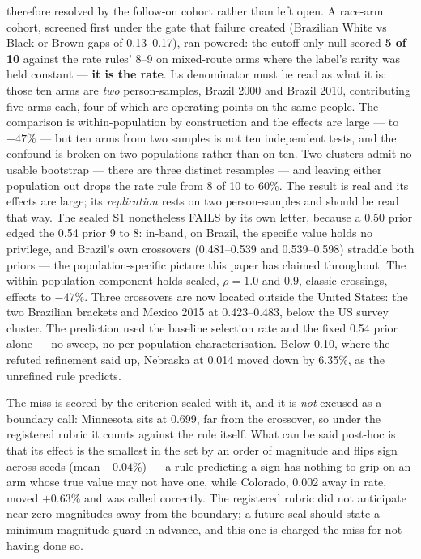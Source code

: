 \documentclass[conference]{IEEEtran}
\begin{document}
therefore resolved by the follow-on cohort rather than left open. A race-arm cohort,
screened first under the gate that failure created (Brazilian White vs Black-or-Brown
gaps of 0.13--0.17), ran powered: the cutoff-only null scored \textbf{5 of 10}
against the rate rules' 8--9 on mixed-route arms where the label's rarity was held
constant --- \textbf{it is the rate}. Its denominator must be read as what it is: those
ten arms are \emph{two} person-samples, Brazil 2000 and Brazil 2010, contributing five
arms each, four of which are operating points on the same people. The comparison is
within-population by construction and the effects are large --- to $-47\%$ --- but ten
arms from two samples is not ten independent tests, and the confound is broken on two
populations rather than on ten. Two clusters admit no usable bootstrap --- there are three
distinct resamples --- and leaving either population out drops the rate rule from 8 of 10
to 60\%. The result is real and its effects are large; its \emph{replication} rests on two
person-samples and should be read that way. The sealed S1 nonetheless FAILS by its own
letter, because a 0.50 prior edged the 0.54 prior 9 to 8: in-band, on Brazil, the
specific value holds no privilege, and Brazil's own crossovers (0.481--0.539 and
0.539--0.598) straddle both priors --- the population-specific picture this paper has
claimed throughout. The within-population component holds sealed, $\rho = 1.0$ and
$0.9$, classic crossings, effects to $-47\%$. Three crossovers are now located
outside the United States: the two Brazilian brackets and Mexico 2015 at
0.423--0.483, below the US survey cluster. The prediction used
the baseline selection rate and the fixed 0.54 prior alone --- no sweep, no per-population
characterisation. Below 0.10, where the refuted refinement said up, Nebraska at 0.014 moved
down by 6.35\%, as the unrefined rule predicts.

The miss is scored by the criterion sealed with it, and it is \emph{not} excused as a boundary
call: Minnesota sits at 0.699, far from the crossover, so under the registered rubric it
counts against the rule itself. What can be said post-hoc is that its effect is the smallest
in the set by an order of magnitude and flips sign across seeds (mean $-0.04\%$) --- a rule
predicting a sign has nothing to grip on an arm whose true value may not have one, while
Colorado, 0.002 away in rate, moved $+0.63\%$ and was called correctly. The registered rubric
did not anticipate near-zero magnitudes away from the boundary; a future seal should state a
minimum-magnitude guard in advance, and this one is charged the miss for not having done so.
\end{document}

